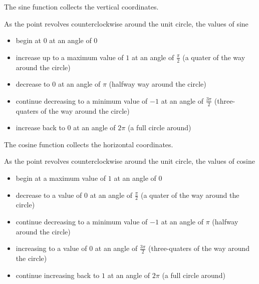 \documentclass{ximera}
\begin{document}
The sine function collects the vertical coordinates.


\begin{center}
\end{center}

As the point revolves counterclockwise around the unit circle, the values of sine 

\begin{itemize}
\item begin at $0$ at an angle of $0$
\item increase up to a maximum value of $1$ at an angle of $\frac{\pi}{2}$ (a quater of the way around the circle)
\item decrease to $0$ at an angle of $\pi$ (halfway way around the circle)
\item continue decreasing to a minimum value of $-1$ at an angle of $\frac{3 \pi}{2}$ (three-quaters of the way around the circle)
\item increase back to $0$ at an angle of $2 \pi$ (a full circle around)
\end{itemize}










The cosine function collects the horizontal coordinates.

\begin{center}
\end{center}

As the point revolves counterclockwise around the unit circle, the values of cosine 

\begin{itemize}
\item begin at a maximum value of $1$ at an angle of $0$
\item decrease to a value of $0$ at an angle of $\frac{\pi}{2}$ (a quater of the way around the circle)
\item continue decreasing to a minimum value of $-1$ at an angle of $\pi$ (halfway around the circle)
\item increasing to a value of $0$ at an angle of $\frac{3 \pi}{2}$ (three-quaters of the way around the circle)
\item continue increasing back to $1$ at an angle of $2 \pi$ (a full circle around)
\end{itemize}
\end{document}
